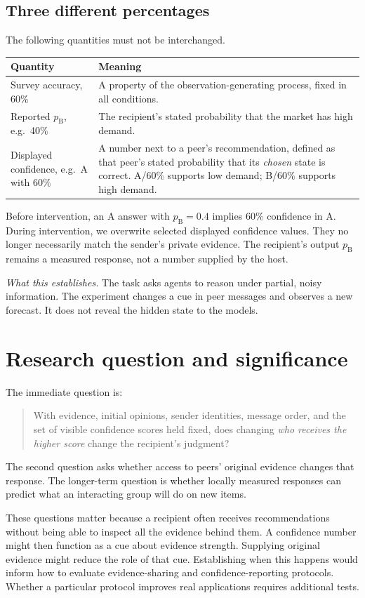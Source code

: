 \documentclass[11pt]{article}
\newcommand{\takeaway}[1]{\par\smallskip\noindent\textit{What this establishes.} #1\par\medskip}
\newcommand{\pB}{p_{\mathrm B}}
\begin{document}
\subsection{Three different percentages}
The following quantities must not be interchanged.
\begin{center}\small
\begin{tabularx}{\linewidth}{@{}p{.23\linewidth}Y@{}}\toprule
Quantity & Meaning \\\midrule
Survey accuracy, 60\% & A property of the observation-generating process, fixed in all conditions. \\
Reported $\pB$, e.g.\ 40\% & The recipient's stated probability that the market has high demand. \\
Displayed confidence, e.g.\ A with 60\% & A number next to a peer's recommendation, defined as that peer's stated probability that its \emph{chosen} state is correct. A/60\% supports low demand; B/60\% supports high demand. \\\bottomrule
\end{tabularx}
\end{center}
Before intervention, an A answer with $\pB=0.4$ implies 60\% confidence in A. During intervention, we overwrite selected displayed confidence values. They no longer necessarily match the sender's private evidence. The recipient's output $\pB$ remains a measured response, not a number supplied by the host.

\takeaway{The task asks agents to reason under partial, noisy information. The experiment changes a cue in peer messages and observes a new forecast. It does not reveal the hidden state to the models.}

\section{Research question and significance}
\label{sec:question}
The immediate question is:
\begin{quote}
With evidence, initial opinions, sender identities, message order, and the set of visible confidence scores held fixed, does changing \emph{who receives the higher score} change the recipient's judgment?
\end{quote}
The second question asks whether access to peers' original evidence changes that response. The longer-term question is whether locally measured responses can predict what an interacting group will do on new items.

These questions matter because a recipient often receives recommendations without being able to inspect all the evidence behind them. A confidence number might then function as a cue about evidence strength. Supplying original evidence might reduce the role of that cue. Establishing when this happens would inform how to evaluate evidence-sharing and confidence-reporting protocols. Whether a particular protocol improves real applications requires additional tests.
\end{document}
